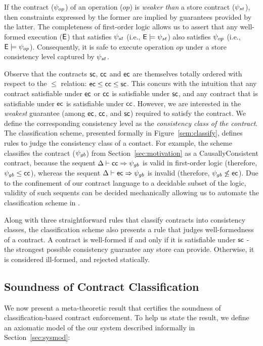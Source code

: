 If the contract ($\psi_{op}$) of an operation ($\mathit{op}$) is \emph{weaker
than} a store contract ($\psi_{st}$), then constraints expressed by the
former are implied by guarantees provided by the latter.  The
completeness of first-order logic\cite{completeness} allows us to assert
that any well-formed execution (${\normalfont \textsf{E}}$) that satisfies $\psi_{st}$ (i.e.,
${\normalfont \textsf{E}}\models \psi_{st}$) also satisfies $\psi_{op}$ (i.e., ${\normalfont \textsf{E}} \models
\psi_{op}$). Consequently, it is safe to execute operation $\mathit{op}$ under
a store consistency level captured by $\psi_{st}$.

Observe that the contracts ${\sf sc}$, ${\sf cc}$ and ${\sf ec}$ are themselves
totally ordered with respect to the $\le$ relation: ${\sf ec} \le {\sf cc} \le
{\sf sc}$.  This concurs with the intuition that any contract satisfiable
under ${\sf ec}$ or ${\sf cc}$ is satisfiable under ${\sf sc}$, and any contract
that is satisfiable under ${\sf ec}$ is satisfiable under ${\sf cc}$. However,
we are interested in the \emph{weakest} guarantee (among ${\sf ec}$,
${\sf cc}$, and ${\sf sc}$) required to satisfy the contract. We define the
corresponding consistency level as the \emph{consistency class of the
contract}. The classification scheme, presented formally in
Figure~\ref{sem:classify}, defines rules to judge the consistency class of
a contact. For example, the scheme classifies the  contract
($\psi_{gb}$) from Section~\ref{sec:motivation} as a {\sf
CausallyConsistent} contract, because the sequent $\Delta \vdash {\sf cc}
\Rightarrow \psi_{gb}$ is valid in first-order logic (therefore,
$\psi_{gb} \le {\sf cc}$), whereas the sequent $\Delta \vdash {\sf ec}
\Rightarrow \psi_{gb}$ is invalid (therefore, $\psi_{gb} \not\le {\sf ec}$).
Due to the confinement of our contract language to a decidable subset
of the logic, validity of such sequents can be decided mechanically
allowing us to automate the classification scheme in \name.

Along with three straightforward rules that classify contracts into
consistency classes, the classification scheme also presents a rule
that judges well-formedness of a contract. A contract is well-formed
if and only if it is satisfiable under ${\sf sc}$ - the strongest possible
consistency guarantee any store can provide. Otherwise, it is
considered ill-formed, and rejected statically.

\subsection{Soundness of Contract Classification}

We now present a meta-theoretic result that certifies the soundness of
classification-based contract enforcement. To help us state the result, we
define an axiomatic model of the our system described informally in
Section~\ref{sec:sysmod}:

